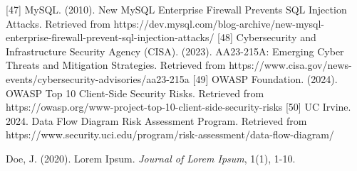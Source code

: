 \documentclass[letterpaper,twocolumn]{article}
\begin{document}
[47] MySQL. (2010). New MySQL Enterprise Firewall Prevents SQL Injection Attacks. Retrieved from https://dev.mysql.com/blog-archive/new-mysql-enterprise-firewall-prevent-sql-injection-attacks/
[48] Cybersecurity and Infrastructure Security Agency (CISA). (2023). AA23-215A: Emerging Cyber Threats and Mitigation Strategies. Retrieved from https://www.cisa.gov/news-events/cybersecurity-advisories/aa23-215a
[49] OWASP Foundation. (2024). OWASP Top 10 Client-Side Security Risks. Retrieved from https://owasp.org/www-project-top-10-client-side-security-risks
[50] UC Irvine. 2024. Data Flow Diagram Risk Assessment Program. Retrieved from https://www.security.uci.edu/program/risk-assessment/data-flow-diagram/




\begin{thebibliography}{9}
    Doe, J. (2020). Lorem Ipsum. \textit{Journal of Lorem Ipsum}, 1(1), 1-10.
\end{thebibliography}
\end{document}
